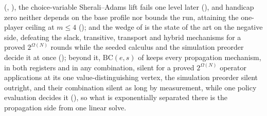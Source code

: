 \documentclass[11pt]{article}
\theoremstyle{plain}
\theoremstyle{definition}
\begin{document}
(, ), the choice-variable
Sherali--Adams lift fails one level later (), and
handicap zero neither depends on the base profile nor bounds the run,
attaining the one-player ceiling at $m\le4$
(); and the wedge of
 is the state of the art on the negative side, defeating
the slack, transitive, transport and hybrid mechanisms for a proved
$2^{\Omega(N)}$ rounds while the seeded calculus and the simulation
preorder decide it at once (); beyond it,
$\mathrm{BC}(e,s)$ of  keeps every propagation mechanism, in
both registers and in any combination, silent for a proved
$2^{\Omega(N)}$ operator applications at its one value-distinguishing
vertex, the simulation preorder silent outright, and their combination
silent as long by measurement, while one policy evaluation decides it
(), so what is exponentially separated there is the
propagation side from one linear solve.
\end{document}
